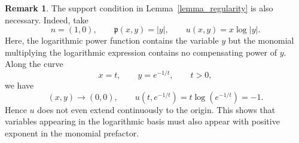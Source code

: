\documentclass{amsart}
\theoremstyle{plain}
\theoremstyle{definition}
\newtheorem{remark}[theorem]{Remark}
\begin{document}
\begin{remark}
The support condition in Lemma~\ref{lemma_regularity} is also necessary. Indeed, take
\begin{equation}
        n=(1,0),
        \qquad
        \mathfrak p(x,y)=|y|,
        \qquad
     u(x,y)=x\log|y|.
\end{equation}
Here, the logarithmic power function contains the variable $y$ but the monomial multiplying the logarithmic expression
contains no compensating power of $y$. Along the curve
\begin{equation}
        x=t,
        \qquad
        y=e^{-1/t},
        \qquad
        t>0,
\end{equation}
we have
\begin{equation}
        (x,y)\to(0,0),
        \qquad
        u(t,e^{-1/t})
        =
        t\log(e^{-1/t})
        =
        -1.
\end{equation}
Hence $u$ does not even extend continuously to the origin. This shows that variables
appearing in the logarithmic basis must also appear with positive exponent in the monomial
prefactor.
\end{remark}
\end{document}
